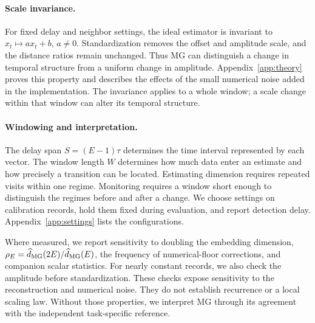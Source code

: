 {\paragraph{Scale invariance.}
For fixed delay and neighbor settings, the ideal estimator is invariant to $x_t\mapsto ax_t+b$, $a\ne0$. Standardization removes the offset and amplitude scale, and the distance ratios remain unchanged. Thus MG can distinguish a change in temporal structure from a uniform change in amplitude. Appendix~\ref{app:theory} proves this property and describes the effects of the small numerical noise added in the implementation. The invariance applies to a whole window; a scale change within that window can alter its temporal structure.

\paragraph{Windowing and interpretation.}
The delay span $S=(E-1)\tau$ determines the time interval represented by each vector. The window length $W$ determines how much data enter an estimate and how precisely a transition can be located. Estimating dimension requires repeated visits within one regime. Monitoring requires a window short enough to distinguish the regimes before and after a change. We choose settings on calibration records, hold them fixed during evaluation, and report detection delay. Appendix~\ref{app:settings} lists the configurations.

Where measured, we report sensitivity to doubling the embedding dimension, $\rho_E=\widehat d_{\mathrm{MG}}(2E)/\widehat d_{\mathrm{MG}}(E)$, the frequency of numerical-floor corrections, and companion scalar statistics. For nearly constant records, we also check the amplitude before standardization. These checks expose sensitivity to the reconstruction and numerical noise. They do not establish recurrence or a local scaling law. Without those properties, we interpret MG through its agreement with the independent task-specific reference.
}
